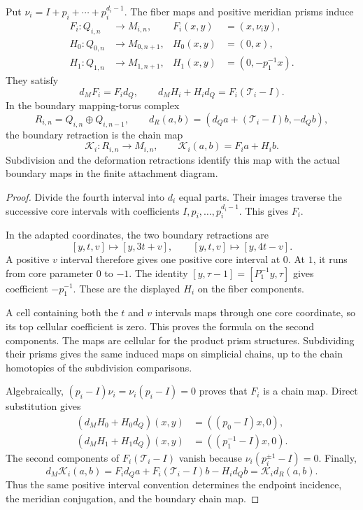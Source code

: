 \begin{lemma}\label{cc:lem:prisms}
Put $\nu_i=I+p_i+\cdots+p_i^{d_i-1}$.
The fiber maps and positive meridian prisms induce
\begin{equation}\label{cc:eq:local-maps}
\begin{aligned}
F_i:Q_{i,n}&\longrightarrow M_{i,n},& F_i(x,y)&=(x,\nu_i y),\\
H_0:Q_{0,n}&\longrightarrow M_{0,n+1},&H_0(x,y)&=(0,x),\\
H_1:Q_{1,n}&\longrightarrow M_{1,n+1},&H_1(x,y)&=(0,-p_1^{-1}x).
\end{aligned}
\end{equation}
They satisfy
\begin{equation}\label{cc:eq:local-homotopy}
d_MF_i=F_id_Q,\qquad
d_MH_i+H_id_Q=F_i(\mathcal T_i-I).
\end{equation}
In the boundary mapping-torus complex
\[
R_{i,n}=Q_{i,n}\oplus Q_{i,n-1},\qquad
d_R(a,b)=(d_Qa+(\mathcal T_i-I)b,-d_Qb),
\]
the boundary retraction is the chain map
\begin{equation}\label{cc:eq:boundary-prism-map}
\mathcal K_i:R_{i,n}\longrightarrow M_{i,n},\qquad
\mathcal K_i(a,b)=F_i a+H_i b.
\end{equation}
Subdivision and the deformation retractions identify this map with
the actual boundary maps in the finite attachment diagram.
\end{lemma}

\begin{proof}
Divide the fourth interval into $d_i$ equal parts.
Their images traverse the successive core intervals with coefficients
$I,p_i,\ldots,p_i^{d_i-1}$. This gives $F_i$.

In the adapted coordinates, the two boundary retractions are
\[
[y,t,v]\longmapsto[y,3t+v],\qquad
[y,t,v]\longmapsto[y,4t-v].
\]
A positive $v$ interval therefore gives one positive core interval at $0$.
At $1$, it runs from core parameter $0$ to $-1$.
The identity $[y,\tau-1]=[P_1^{-1}y,\tau]$ gives coefficient
$-p_1^{-1}$. These are the displayed $H_i$ on the fiber components.

A cell containing both the $t$ and $v$ intervals maps through one core
coordinate, so its top cellular coefficient is zero.
This proves the formula on the second components.
The maps are cellular for the product prism structures.
Subdividing their prisms gives the same induced maps on simplicial chains,
up to the chain homotopies of the subdivision comparisons.

Algebraically, $(p_i-I)\nu_i=\nu_i(p_i-I)=0$ proves that $F_i$ is a
chain map. Direct substitution gives
\[
\begin{aligned}
(d_MH_0+H_0d_Q)(x,y)&=((p_0-I)x,0),\\
(d_MH_1+H_1d_Q)(x,y)&=((p_1^{-1}-I)x,0).
\end{aligned}
\]
The second components of $F_i(\mathcal T_i-I)$ vanish because
$\nu_i(p_i^{\pm1}-I)=0$.
Finally,
\[
d_M\mathcal K_i(a,b)
=F_id_Qa+F_i(\mathcal T_i-I)b-H_id_Qb
=\mathcal K_id_R(a,b).
\]
Thus the same positive interval convention determines the endpoint
incidence, the meridian conjugation, and the boundary chain map.
\end{proof}

